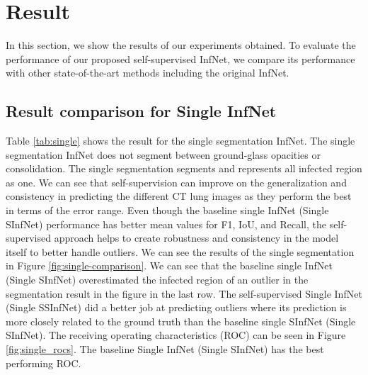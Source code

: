 
\section{Result}
In this section, we show the results of our experiments obtained. To evaluate the performance of our proposed self-supervised InfNet, we compare its performance with other state-of-the-art methods including the original InfNet.

\subsection{Result comparison for Single InfNet}
Table \ref{tab:single} shows the result for the single segmentation InfNet. The single segmentation InfNet does not segment between ground-glass opacities or consolidation. The single segmentation segments and represents all infected region as one. We can see that self-supervision can improve on the generalization and consistency in predicting the different CT lung images as they perform the best in terms of the error range. Even though the baseline single InfNet (Single SInfNet) performance has better mean values for F1, IoU, and Recall, the self-supervised approach helps to create robustness and consistency in the model itself to better handle outliers. We can see the results of the single segmentation in Figure \ref{fig:single-comparison}. We can see that the baseline single InfNet (Single SInfNet) overestimated the infected region of an outlier in the segmentation result in the figure in the last row. The self-supervised Single InfNet (Single SSInfNet) did a better job at predicting outliers where its prediction is more closely related to the ground truth than the baseline single SInfNet (Single SInfNet). The receiving operating characteristics (ROC) can be seen in Figure \ref{fig:single_rocs}. The baseline Single InfNet (Single SInfNet) has the best performing ROC.
 
